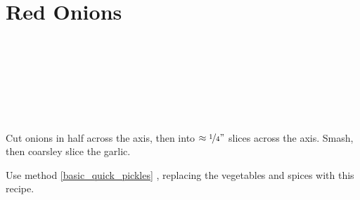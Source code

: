 \section{Red Onions}

\begin{ingredientcolumns}[1]
	\begin{ingredientblock}
		\\
		\\
		\\
		\\
		\\
		\\
	\end{ingredientblock}
\end{ingredientcolumns}


\begin{preparation}
\item Cut onions in half across the axis, then into $\approx\nicefrac{1}{4} "$ slices across the axis.
	Smash, then coarsley slice the garlic.

\item Use method \ref{basic_quick_pickles} , replacing the vegetables and spices with this recipe.
\end{preparation}


\recipeend
